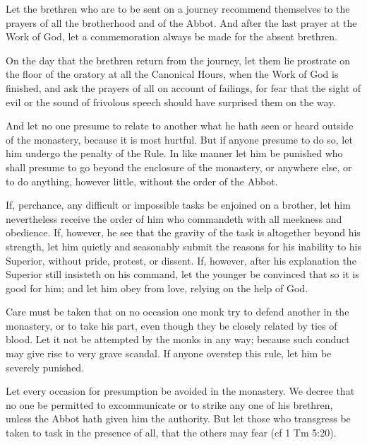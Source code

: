 
Let the brethren who are to be sent on a journey recommend themselves to the prayers of all the brotherhood and of the Abbot. And after the last prayer at the Work of God, let a commemoration always be made for the absent brethren.

On the day that the brethren return from the journey, let them lie prostrate on the floor of the oratory at all the Canonical Hours, when the Work of God is finished, and ask the prayers of all on account of failings, for fear that the sight of evil or the sound of frivolous speech should have surprised them on the way.

And let no one presume to relate to another what he hath seen or heard outside of the monastery, because it is most hurtful. But if anyone presume to do so, let him undergo the penalty of the Rule. In like manner let him be punished who shall presume to go beyond the enclosure of the monastery, or anywhere else, or to do anything, however little, without the order of the Abbot.


If, perchance, any difficult or impossible tasks be enjoined on a brother, let him nevertheless receive the order of him who commandeth with all meekness and obedience. If, however, he see that the gravity of the task is altogether beyond his strength, let him quietly and seasonably submit the reasons for his inability to his Superior, without pride, protest, or dissent. If, however, after his explanation the Superior still insisteth on his command, let the younger be convinced that so it is good for him; and let him obey from love, relying on the help of God.


Care must be taken that on no occasion one monk try to defend another in the monastery, or to take his part, even though they be closely related by ties of blood. Let it not be attempted by the monks in any way; because such conduct may give rise to very grave scandal. If anyone overstep this rule, let him be severely punished.


Let every occasion for presumption be avoided in the monastery. We decree that no one be permitted to excommunicate or to strike any one of his brethren, unless the Abbot hath given him the authority. But let those who transgress be taken to task in the presence of all, that the others may fear (cf 1 Tm 5:20).

